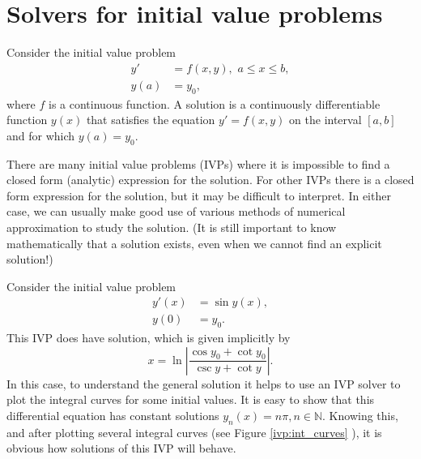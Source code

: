 \label{lab:IVP}


\section{Solvers for initial value problems}

Consider the initial value problem 
\begin{align*}
y' &= f(x,y),\,\, a \leq x \leq b, \\
y(a) &= y_0,
\end{align*}
where $f$ is a continuous function. A solution is a continuously differentiable function $y(x)$ that satisfies the equation $y' = f(x,y)$ on the interval $[a,b]$ and for which $y(a) = y_0$.  


There are many initial value problems (IVPs) where it is impossible to find a closed form (analytic) expression for the solution. 
For other IVPs there is a closed form expression for the solution, but it may be difficult to interpret. 
In either case, we can usually make good use of various methods of numerical approximation to study the solution. (It is still important to know mathematically that a solution exists, even when we cannot find an explicit solution!)


Consider the initial value problem 
\begin{align*}
y'(x) &= \sin y(x), \\
y(0) &= y_0.
\end{align*}
This IVP does have solution, which is given implicitly by 
\[x = \ln \left|\frac{\cos y_0 + \cot y_0}{\csc y + \cot y} \right|.\]
In this case, to understand the general solution it helps to use an IVP solver to plot the integral curves for some initial values. It is easy to show that this differential equation has constant solutions $y_n(x) = n \pi, n \in \mathbb{N}$. Knowing this, and after plotting several integral curves (see Figure \ref{ivp:int_curves} ), it is obvious how solutions of this IVP will behave.

